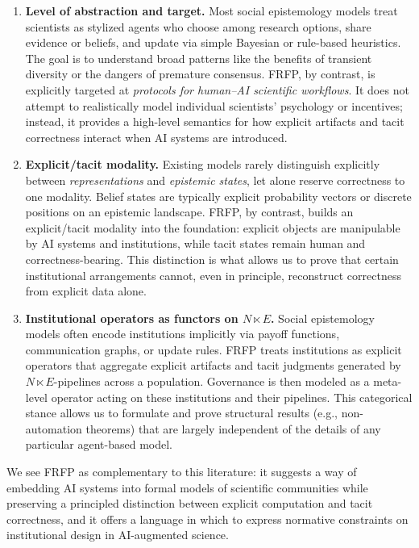 \documentclass[11pt]{article}
\theoremstyle{definition}
\begin{document}
\begin{enumerate}
  \item \textbf{Level of abstraction and target.}
  Most social epistemology models treat scientists as stylized agents who choose among research options, share evidence or beliefs, and update via simple Bayesian or rule-based heuristics. The goal is to understand broad patterns like the benefits of transient diversity or the dangers of premature consensus. FRFP, by contrast, is explicitly targeted at \emph{protocols for human--AI scientific workflows}. It does not attempt to realistically model individual scientists' psychology or incentives; instead, it provides a high-level semantics for how explicit artifacts and tacit correctness interact when AI systems are introduced.

  \item \textbf{Explicit/tacit modality.}
  Existing models rarely distinguish explicitly between \emph{representations} and \emph{epistemic states}, let alone reserve correctness to one modality. Belief states are typically explicit probability vectors or discrete positions on an epistemic landscape. FRFP, by contrast, builds an explicit/tacit modality into the foundation: explicit objects are manipulable by AI systems and institutions, while tacit states remain human and correctness-bearing. This distinction is what allows us to prove that certain institutional arrangements cannot, even in principle, reconstruct correctness from explicit data alone.

  \item \textbf{Institutional operators as functors on $N \ltimes E$.}
  Social epistemology models often encode institutions implicitly via payoff functions, communication graphs, or update rules. FRFP treats institutions as explicit operators that aggregate explicit artifacts and tacit judgments generated by $N \ltimes E$-pipelines across a population. Governance is then modeled as a meta-level operator acting on these institutions and their pipelines. This categorical stance allows us to formulate and prove structural results (e.g., non-automation theorems) that are largely independent of the details of any particular agent-based model.
\end{enumerate}

We see FRFP as complementary to this literature: it suggests a way of embedding AI systems into formal models of scientific communities while preserving a principled distinction between explicit computation and tacit correctness, and it offers a language in which to express normative constraints on institutional design in AI-augmented science.
\end{document}
